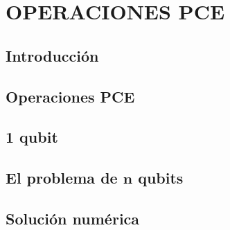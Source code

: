 \chapter{OPERACIONES PCE}

\section{Introducción}

\section{Operaciones PCE}

\section{1 qubit}

\section{El problema de $\mathbf{n}$ qubits}

\section{Solución numérica}
